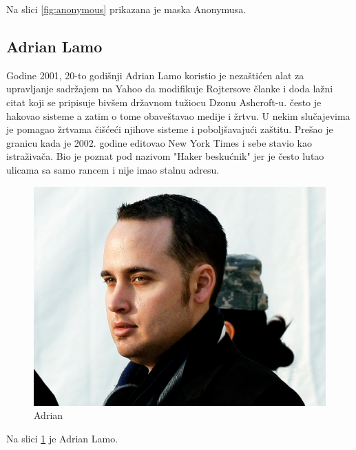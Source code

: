 \documentclass[a4paper]{article}
\begin{document}
 Na slici \ref{fig:anonymous} prikazana je maska Anonymusa. 
 
 \subsection{Adrian Lamo}
Godine 2001, 20-to godišnji Adrian Lamo koristio je nezaštićen alat za upravljanje sadržajem na Yahoo da modifikuje Rojtersove članke i doda lažni citat koji se pripisuje bivšem državnom tužiocu Dzonu Ashcroft-u. često je hakovao sisteme a zatim o tome obaveštavao medije i žrtvu. U nekim slučajevima je pomagao žrtvama čišćeći njihove sisteme i poboljšavajući zaštitu. Prešao je granicu kada je 2002. godine editovao New York Times i sebe stavio kao istraživača. Bio je poznat pod nazivom "Haker beskućnik" jer je često lutao ulicama sa samo rancem i nije imao stalnu adresu.
\begin{figure}[h!]
	\begin{center}
		\includegraphics[scale=0.10]{adrian.jpg}
	\end{center}
	\caption{Adrian}
	\label{fig:adrian}
\end{figure}

Na slici \ref{fig:adrian} je Adrian Lamo.

\newpage
\end{document}

